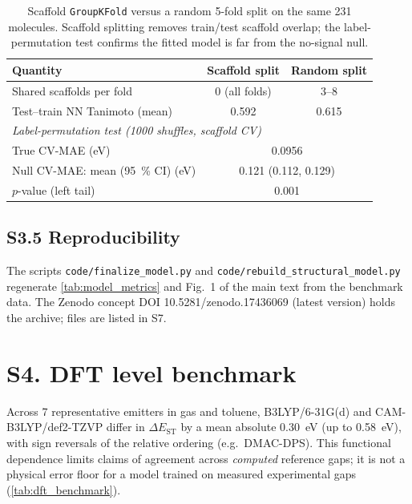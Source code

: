 \documentclass[final,3p,times,twocolumn]{elsarticle}
\makeatletter
\newcommand{\silabel}[2]{\phantomsection\protected@edef\@currentlabel{#1}\label{#2}}
\makeatother
\begin{document}
\begin{table}[htbp]
  \centering
  \caption{Scaffold \texttt{GroupKFold} versus a random 5-fold split on the same
    \num{231} molecules. Scaffold splitting removes train/test scaffold overlap; the
    label-permutation test confirms the fitted model is far from the no-signal null.}
  \label{tab:scaffold}
  \footnotesize\setlength{\tabcolsep}{3pt}
  \begin{tabular}{lcc}
    \toprule
    Quantity & Scaffold split & Random split \\
    \midrule
    Shared scaffolds per fold        & 0 (all folds) & 3--8 \\
    Test--train NN Tanimoto (mean)   & 0.592 & 0.615 \\
    \midrule
    \multicolumn{3}{l}{\emph{Label-permutation test (1000 shuffles, scaffold CV)}} \\
    True CV-MAE (eV)                 & \multicolumn{2}{c}{0.0956} \\
    Null CV-MAE: mean (\qty{95}{\percent} CI) (eV) & \multicolumn{2}{c}{0.121 (0.112, 0.129)} \\
    $p$-value (left tail)            & \multicolumn{2}{c}{0.001} \\
    \bottomrule
  \end{tabular}
\end{table}

\subsection*{S3.5 Reproducibility}
The scripts \texttt{code/finalize\_model.py} and
\texttt{code/rebuild\_structural\_model.py} regenerate \cref{tab:model_metrics}
and Fig.~1 of the main text from the benchmark data. The Zenodo
concept DOI \mbox{10.5281/zenodo.17436069} (latest version) holds the archive;
files are listed in S7.

\section*{S4. DFT level benchmark}\silabel{S4}{sec:dft_benchmark}
Across \num{7} representative emitters in gas and toluene, B3LYP/6-31G(d) and
CAM-B3LYP/def2-TZVP differ in $\Delta E_\text{ST}$ by a mean absolute
\qty{0.30}{\electronvolt} (up to \qty{0.58}{\electronvolt}), with sign reversals
of the relative ordering (e.g.\ DMAC-DPS). This functional dependence limits
claims of agreement across \emph{computed} reference gaps; it is not a physical
error floor for a model trained on measured experimental gaps
(\cref{tab:dft_benchmark}).
\end{document}
